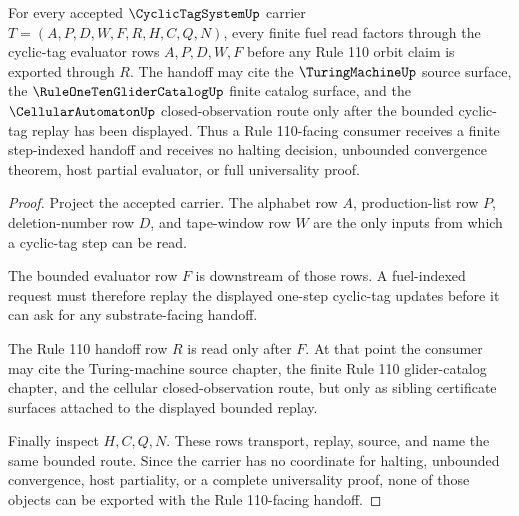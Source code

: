 \begin{theorem}
\label{thm:cyclic-tag-system-step-indexed-rule110-handoff}
For every accepted $\CyclicTagSystemUp$ carrier $T=(A,P,D,W,F,R,H,C,Q,N)$, every finite fuel read factors through the cyclic-tag evaluator rows $A,P,D,W,F$ before any Rule 110 orbit claim is exported through $R$. The handoff may cite the $\TuringMachineUp$ source surface, the $\RuleOneTenGliderCatalogUp$ finite catalog surface, and the $\CellularAutomatonUp$ closed-observation route only after the bounded cyclic-tag replay has been displayed. Thus a Rule 110-facing consumer receives a finite step-indexed handoff and receives no halting decision, unbounded convergence theorem, host partial evaluator, or full universality proof.
\end{theorem}
\begin{proof}
Project the accepted carrier. The alphabet row $A$, production-list row $P$, deletion-number row $D$, and tape-window row $W$ are the only inputs from which a cyclic-tag step can be read.

The bounded evaluator row $F$ is downstream of those rows. A fuel-indexed request must therefore replay the displayed one-step cyclic-tag updates before it can ask for any substrate-facing handoff.

The Rule 110 handoff row $R$ is read only after $F$. At that point the consumer may cite the Turing-machine source chapter, the finite Rule 110 glider-catalog chapter, and the cellular closed-observation route, but only as sibling certificate surfaces attached to the displayed bounded replay.

Finally inspect $H,C,Q,N$. These rows transport, replay, source, and name the same bounded route. Since the carrier has no coordinate for halting, unbounded convergence, host partiality, or a complete universality proof, none of those objects can be exported with the Rule 110-facing handoff.
\end{proof}



